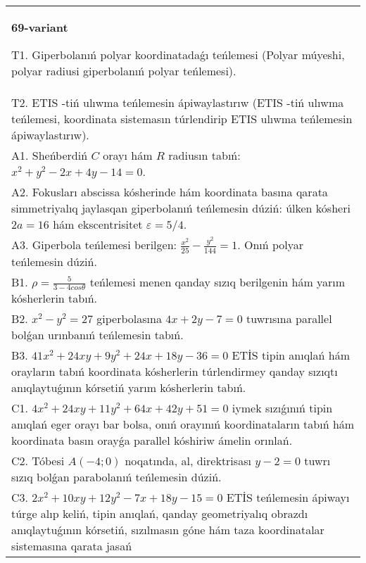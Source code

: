 \documentclass{article}
\begin{document}
\begin{tabular}{m{17cm}}
\textbf{69-variant}
\newline

T1. Giperbolanıń polyar koordinatadaǵı teńlemesi (Polyar múyeshi, polyar radiusi giperbolanıń polyar teńlemesi).\\

T2. ETIS -tiń ulıwma teńlemesin ápiwaylastırıw (ETIS -tiń ulıwma teńlemesi, koordinata sistemasın túrlendirip ETIS ulıwma teńlemesin ápiwaylastırıw).\\

A1. Sheńberdiń $C$ orayı hám $R$ radiusın tabıń: $x^2+y^2-2 x+4 y-14=0$.\\

A2. Fokusları abscissa kósherinde hám koordinata basına qarata simmetriyalıq jaylasqan giperbolanıń teńlemesin dúziń: úlken kósheri $2 a=16$ hám ekscentrisitet $\varepsilon=5/4$.\\

A3. Giperbola teńlemesi berilgen: $\frac{x^{2}}{25}-\frac{y^{2}}{144}=1$. Onıń polyar teńlemesin dúziń.\\

B1. $\rho = \frac{5}{3 - 4cos\theta}$ teńlemesi menen qanday sızıq berilgenin hám yarım kósherlerin tabıń.  \\

B2. $x^{2} - y^{2} = 27$ giperbolasına $4x + 2y - 7 = 0$ tuwrısına parallel bolǵan urınbanıń teńlemesin tabıń.  \\

B3. $41x^{2} + 24xy + 9y^{2} + 24x + 18y - 36 = 0$ ETİS tipin anıqlań hám orayların tabıń koordinata kósherlerin túrlendirmey qanday sızıqtı anıqlaytuǵının kórsetiń yarım kósherlerin tabıń.  \\

C1. $4x^{2} + 24xy + 11y^{2} + 64x + 42y + 51 = 0$ iymek sızıǵınıń tipin anıqlań eger orayı bar bolsa, onıń orayınıń koordinataların tabıń hám koordinata basın orayǵa parallel kóshiriw ámelin orınlań.  \\

C2. Tóbesi $A(-4;0)$ noqatında, al, direktrisası $y - 2 = 0$ tuwrı sızıq bolǵan parabolanıń teńlemesin dúziń.\\

C3. $2x^{2} + 10xy + 12y^{2} - 7x + 18y - 15 = 0$ ETİS teńlemesin ápiwayı túrge alıp keliń, tipin anıqlań, qanday geometriyalıq obrazdı anıqlaytuǵının kórsetiń, sızılmasın góne hám taza koordinatalar sistemasına qarata jasań  \\

\end{tabular}
\vspace{1cm}
\end{document}
